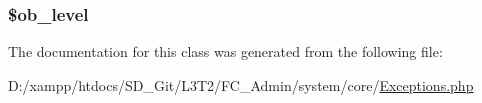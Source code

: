 \subsubsection[{\$ob\+\_\+level}]{\setlength{\rightskip}{0pt plus 5cm}\$ob\+\_\+level}\label{class_c_i___exceptions_abb6b6587dbaf0238bf26829c8df05d59}


The documentation for this class was generated from the following file\+:\begin{DoxyCompactItemize}
\item 
D\+:/xampp/htdocs/\+S\+D\+\_\+\+Git/\+L3\+T2/\+F\+C\+\_\+\+Admin/system/core/\hyperlink{_exceptions_8php}{Exceptions.\+php}\end{DoxyCompactItemize}

